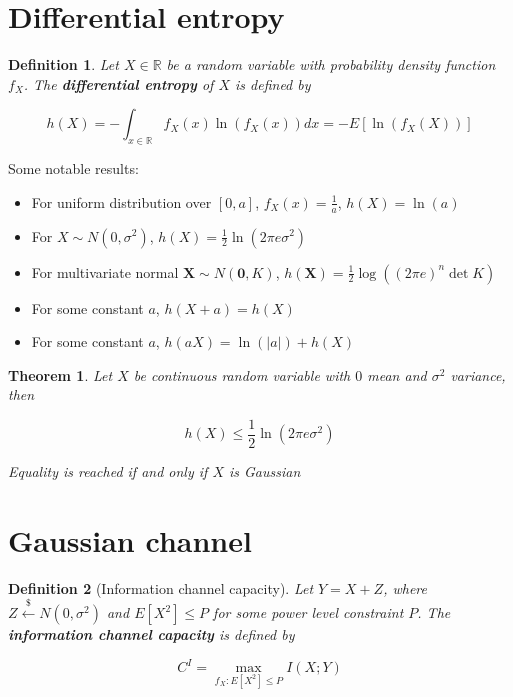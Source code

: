 \documentclass{article}
\newcommand{\norm}[1]{\vert {#1} \vert}
\newcommand{\leftsample}{\overset{{\scriptscriptstyle\$}}{\leftarrow}}
\newtheorem{definition}{Definition}[section]
\newtheorem{theorem}{Theorem}[section]
\begin{document}
\section{Differential entropy}
\begin{definition}
    Let $X \in \mathbb{R}$ be a random variable with probability density function $f_X$. The \textbf{differential entropy} of $X$ is defined by

    \begin{equation*}
        h(X) = -\int_{x \in \mathbb{R}} f_X(x)\ln(f_X(x))dx = -E[\ln(f_X(X))]
    \end{equation*}
\end{definition}

Some notable results:

\begin{itemize}
    \item For uniform distribution over $[0, a]$, $f_X(x) = \frac{1}{a}$, $h(X) = \ln(a)$
    \item For $X \sim N(0, \sigma^2)$, $h(X) = \frac{1}{2}\ln(2\pi e \sigma^2)$
    \item For multivariate normal $\mathbf{X} \sim N(\mathbf{0}, K)$, $h(\mathbf{X}) = \frac{1}{2}\log ((2\pi e)^n \det{K})$
    \item For some constant $a$, $h(X + a) = h(X)$
    \item For some constant $a$, $h(aX) = \ln(\norm{a}) + h(X)$
\end{itemize}

\begin{theorem}
    Let $X$ be continuous random variable with $0$ mean and $\sigma^2$ variance, then

    \begin{equation*}
        h(X) \leq \frac{1}{2}\ln(2\pi e \sigma^2)
    \end{equation*}

    Equality is reached if and only if $X$ is Gaussian
\end{theorem}

\section{Gaussian channel}
\begin{definition}[Information channel capacity]
    Let $Y = X + Z$, where $Z \leftsample N(0, \sigma^2)$ and $E[X^2] \leq P$ for some power level constraint $P$. The \textbf{information channel capacity} is defined by

    $$
    C^I = \max_{f_X : E[X^2] \leq P} I(X; Y)
    $$
\end{definition}
\end{document}
